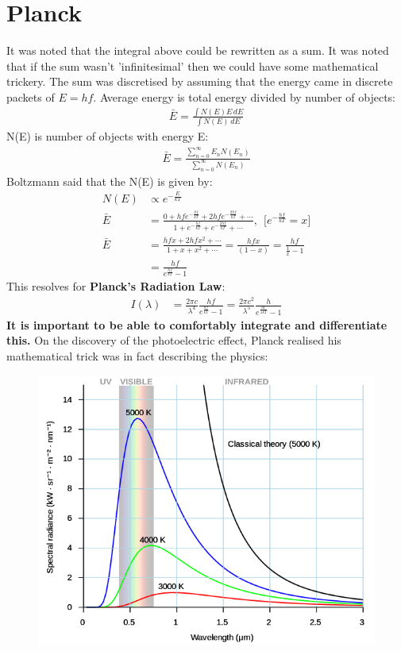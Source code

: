 \documentclass[a4paper, 11pt, normalem]{report}
\begin{document}
\section{Planck}
It was noted that the integral above could be rewritten as a sum.
It was noted that if the sum wasn't 'infinitesimal' then we could have some mathematical trickery.
The sum was discretised by assuming that the energy came in discrete packets of $E = hf$.
Average energy is total energy divided by number of objects:
\begin{align}
    \bar{E} = \frac{\int N(E)E\,dE}{\int N(E)\,dE}
\end{align}
N(E) is number of objects with energy E:
\begin{align}
    \bar{E} = \frac{\sum_{n = 0}^{\infty} E_{n} N(E_{n})}{\sum_{n=0}^{\infty} N(E_{n})}
\end{align}
Boltzmann said that the N(E) is given by:
\begin{align}
    N(E) &\propto e^{-\tfrac{E}{kT}} \\
    \bar{E} &= \frac{0 + hfe^{-\tfrac{hf}{kT}} + 2hfe^{-\tfrac{2hf}{kT}} + \cdots}{1 + e^{-\tfrac{hf}{kT}} + e^{-\tfrac{2hf}{kT}} + \cdots},~~\Big[e^{-\tfrac{hf}{kT}} = x\Big]  \\
    \bar{E} &= \frac{hfx + 2hfx^{2} + \cdots}{1 + x + x^{2} + \cdots} = \frac{hfx}{(1-x)} = \frac{hf}{\tfrac{1}{x} - 1} \\
            &= \frac{hf}{e^{\tfrac{hf}{kT}} - 1}
\end{align}
This resolves for \textbf{Planck's Radiation Law}:
\begin{align}
    I(\lambda) &= \frac{2\pi c}{\lambda^{4}} \frac{hf}{e^{\tfrac{hf}{kT}} - 1} = \frac{2\pi c^{2}}{\lambda^{5}} \frac{h}{e^{\tfrac{hc}{\lambda kT}} - 1}
\end{align}
\textbf{It is important to be able to comfortably integrate and differentiate this.}
On the discovery of the photoelectric effect, Planck realised his mathematical trick was in fact describing the physics:
\begin{figure}[H]
    \centering
    \includegraphics[scale=0.5]{Planck.png}
\end{figure}
\end{document}
